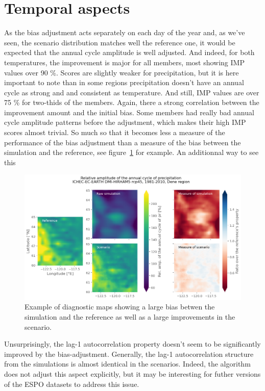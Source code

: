 \documentclass[letterpaper,10pt]{article}
\begin{document}
\section{Temporal aspects}
As the bias adjustment acts separately on each day of the year and, as we've seen, the scenario distribution matches well the reference one, it would be expected that the annual cycle amplitude is well adjusted. And indeed, for both temperatures, the improvement is major for all members, most showing IMP values over 90 \%. Scores are slightly weaker for precipitation, but it is here important to note than in some regions precipitation doesn't have an annual cycle as strong and and consistent as temperature. And still, IMP values are over 75 \% for two-thids of the members. Again, there a strong correlation between the improvement amount and the initial bias. Some members had really bad annual cycle amplitude patterns before the adjustment, which makes their high IMP scores almost trivial. So much so that it becomes less a measure of the performance of the bias adjustment than a measure of the bias between the simulation and the reference, see figure~\ref{fig:acapr} for example. An additionnal way to see this 

\begin{figure}
\includegraphics[width=\textwidth]{../images/aca_pr_diags.png}
\caption{Example of diagnostic maps showing a large bias betwen the simulation and the reference as well as a large improvements in the scenario.}\label{fig:acapr}
\end{figure}


Unsurprisingly, the lag-1 autocorrelation property doesn't seem to be significantly improved by the bias-adjustment. Generally, the lag-1 autocorrelation structure from the simulations is almost identical in the scenarios. Indeed, the algorithm does not adjust this aspect explicitly, but it may be interesting for futher versions of the ESPO datasets to address this issue.
\end{document}
